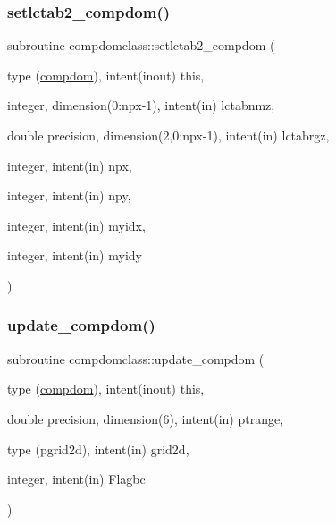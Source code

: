 \mbox{\label{namespacecompdomclass_a4bc32865e40fe6b277898a429caff3ca}} 
\subsubsection{\texorpdfstring{setlctab2\_compdom()}{setlctab2\_compdom()}}
{\footnotesize\ttfamily subroutine compdomclass\+::setlctab2\+\_\+compdom (\begin{DoxyParamCaption}\item[{type (\mbox{\hyperlink{namespacecompdomclass_structcompdomclass_1_1compdom}{compdom}}), intent(inout)}]{this,  }\item[{integer, dimension(0\+:npx-\/1), intent(in)}]{lctabnmz,  }\item[{double precision, dimension(2,0\+:npx-\/1), intent(in)}]{lctabrgz,  }\item[{integer, intent(in)}]{npx,  }\item[{integer, intent(in)}]{npy,  }\item[{integer, intent(in)}]{myidx,  }\item[{integer, intent(in)}]{myidy }\end{DoxyParamCaption})}

\mbox{\label{namespacecompdomclass_a0e7d562b378f77e0d3a14b33168cb46b}} 
\subsubsection{\texorpdfstring{update\_compdom()}{update\_compdom()}}
{\footnotesize\ttfamily subroutine compdomclass\+::update\+\_\+compdom (\begin{DoxyParamCaption}\item[{type (\mbox{\hyperlink{namespacecompdomclass_structcompdomclass_1_1compdom}{compdom}}), intent(inout)}]{this,  }\item[{double precision, dimension(6), intent(in)}]{ptrange,  }\item[{type (pgrid2d), intent(in)}]{grid2d,  }\item[{integer, intent(in)}]{Flagbc }\end{DoxyParamCaption})}



